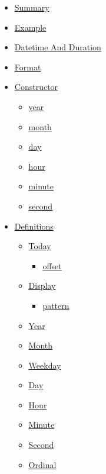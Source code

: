 \begin{itemize}
\tightlist
\item
  \hyperref[summary]{Summary}
\item
  \hyperref[example]{Example}
\item
  \hyperref[datetime-and-duration]{Datetime And Duration}
\item
  \hyperref[format]{Format}
\item
  \hyperref[constructor]{Constructor}

  \begin{itemize}
  \tightlist
  \item
    \hyperref[constructor-year]{year}
  \item
    \hyperref[constructor-month]{month}
  \item
    \hyperref[constructor-day]{day}
  \item
    \hyperref[constructor-hour]{hour}
  \item
    \hyperref[constructor-minute]{minute}
  \item
    \hyperref[constructor-second]{second}
  \end{itemize}
\item
  \hyperref[definitions]{Definitions}

  \begin{itemize}
  \tightlist
  \item
    \hyperref[definitions-today]{Today}

    \begin{itemize}
    \tightlist
    \item
      \hyperref[definitions-today-offset]{offset}
    \end{itemize}
  \item
    \hyperref[definitions-display]{Display}

    \begin{itemize}
    \tightlist
    \item
      \hyperref[definitions-display-pattern]{pattern}
    \end{itemize}
  \item
    \hyperref[definitions-year]{Year}
  \item
    \hyperref[definitions-month]{Month}
  \item
    \hyperref[definitions-weekday]{Weekday}
  \item
    \hyperref[definitions-day]{Day}
  \item
    \hyperref[definitions-hour]{Hour}
  \item
    \hyperref[definitions-minute]{Minute}
  \item
    \hyperref[definitions-second]{Second}
  \item
    \hyperref[definitions-ordinal]{Ordinal}
  \end{itemize}
\end{itemize}

